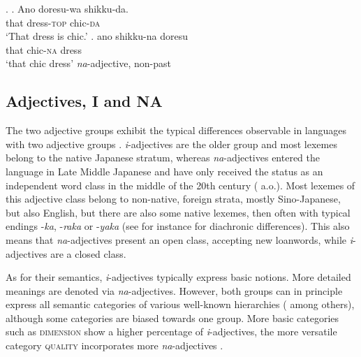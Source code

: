 \documentclass [output=book,colorlinks,citecolor=brown]{langscibook}
\begin{document}
\ex. \ag. Ano doresu-wa shikku-da.\\
that dress-\textsc{top} chic-\textsc{da}\\
`That dress is chic.'
\bg. ano shikku-na doresu\\
that chic-\textsc{na} dress\\
`that chic dress' \null \hfill \textit{na}-adjective, non-past

\subsection{Adjectives, I and NA} \label{chapter 1, i and na}

The two adjective groups exhibit the typical differences observable in languages with two adjective groups \citep{dixon:2004:adj}. \textit{i}-adjectives are the older group and most lexemes belong to the native Japanese stratum, whereas \textit{na}-adjectives entered the language in Late Middle Japanese and have only received the status as an independent word class in the middle of the 20th century (\citealt{kato:2003:nihongo, lewin:2003:abriss, frellesvig:2010:history} a.o.). Most lexemes of this adjective class belong to non-native, foreign strata, mostly Sino-Japanese, but also English, but there are also some native lexemes, then often with typical endings -\textit{ka}, -\textit{raka} or -\textit{yaka} (see for instance \citealt[210–213]{uehara:1998:syntactic} for diachronic differences). This also means that \textit{na}-adjectives present an open class, accepting new loanwords, while \textit{i}-adjectives are a closed class.

As for their semantics, \textit{i}-adjectives typically express basic notions. More detailed meanings are denoted via \textit{na}-adjectives. However, both groups can in principle express all semantic categories of various well-known hierarchies (\citealt{scott:2002:stacked} among others), although some categories are biased towards one group. More basic categories such as \textsc{dimension} show a higher percentage of \textit{i}-adjectives, the more versatile category \textsc{quality} incorporates more \textit{na}-adjectives \citep{uehara:1998:syntactic}. %
\end{document}
